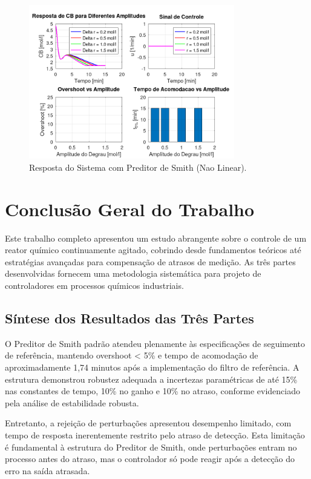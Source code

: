 \documentclass[a4paper,12pt]{article}
\begin{document}
\begin{figure}[H]
    \centering
    \includegraphics[width=0.8\textwidth]{figura_pi_naolinear_amplitudes.png}
    \caption{Resposta do Sistema com Preditor de Smith (Nao Linear).}
    \label{fig:ps_naolinear_resposta}
\end{figure}


\section{Conclusão Geral do Trabalho}

Este trabalho completo apresentou um estudo abrangente sobre o controle de um reator químico continuamente agitado, cobrindo desde fundamentos teóricos até estratégias avançadas para compensação de atrasos de medição. As três partes desenvolvidas fornecem uma metodologia sistemática para projeto de controladores em processos químicos industriais.

\subsection{Síntese dos Resultados das Três Partes}

O Preditor de Smith padrão atendeu plenamente às especificações de seguimento de referência, mantendo overshoot < 5\% e tempo de acomodação de aproximadamente 1,74 minutos após a implementação do filtro de referência. A estrutura demonstrou robustez adequada a incertezas paramétricas de até 15\% nas constantes de tempo, 10\% no ganho e 10\% no atraso, conforme evidenciado pela análise de estabilidade robusta.

Entretanto, a rejeição de perturbações apresentou desempenho limitado, com tempo de resposta inerentemente restrito pelo atraso de detecção. Esta limitação é fundamental à estrutura do Preditor de Smith, onde perturbações entram no processo antes do atraso, mas o controlador só pode reagir após a detecção do erro na saída atrasada.
\end{document}

